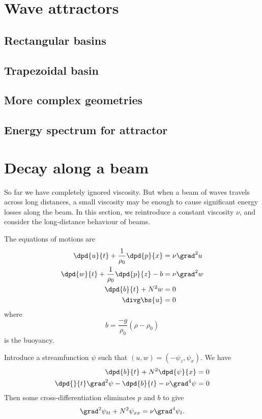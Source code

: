 \section{Wave attractors}
\subsection{Rectangular basins}
\subsection{Trapezoidal basin}
\subsection{More complex geometries}
\subsection{Energy spectrum for attractor}

\section{Decay along a beam}

So far we have completely ignored viscosity. But when a beam of waves
travels across long distances, a small viscosity may be enough to cause
significant energy losses along the beam. In this section, we reintroduce a
constant viscosity $\nu$, and consider the long-distance behaviour of beams. 

The equations of motions are
\begin{align}
	\dpd{u}{t} + \frac{1}{\rho_0}\dpd{p}{x} &= \nu\grad^2 u \\
	\dpd{w}{t} + \frac{1}{\rho_0}\dpd{p}{z} - b &= \nu\grad^2 w \\
	\dpd{b}{t} + N^2w &= 0 \\
	\divg\bs{u} &= 0
\end{align}
where 
\begin{equation}
	b = \displaystyle\frac{-g}{\rho_0} (\rho-\rho_0)
\end{equation}
is the buoyancy. 

Introduce a streamfunction $\psi$ such that $(u,w) = (-\psi_z, \psi_x)$. We have 
\begin{align}
    \dpd{b}{t} + N^2 \dpd{\psi}{x} &= 0 \\
    \dpd{}{t} \grad^2 \psi - \dpd{b}{t} - \nu \grad^4 \psi &= 0
\end{align}
Then some cross-differentiation eliminates $p$ and $b$ to give
\begin{equation}
	\grad^2 \psi_{tt} + N^2 \psi_{xx} = \nu\grad^4 \psi_t. \label{igw-damped}
\end{equation} 

